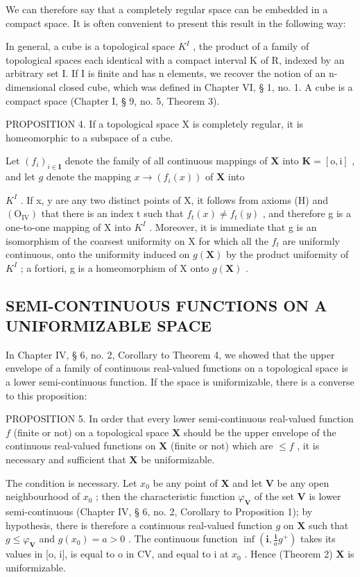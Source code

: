 We can therefore say that a completely regular space can be embedded in a compact space. It is often convenient to present this result in the following way:

In general, a cube is a topological space \(K^{I}\) , the product of a family of topological spaces each identical with a compact interval K of R, indexed by an arbitrary set I. If I is finite and has n elements, we recover the notion of an n-dimensional closed cube, which was defined in Chapter VI, § 1, no. 1. A cube is a compact space (Chapter I, § 9, no. 5, Theorem 3).

PROPOSITION 4. If a topological space X is completely regular, it is homeomorphic to a subspace of a cube.

Let \((f_{i})_{i\in \mathbf{I}}\) denote the family of all continuous mappings of \(\mathbf{X}\) into \(\mathbf{K} = [\mathrm{o},\mathrm{i}]\) , and let \(g\) denote the mapping \(x\to (f_i(x))\) of \(\mathbf{X}\) into

\(K^{I}\) . If x, y are any two distinct points of X, it follows from axioms (H) and \((\mathrm{O}_{\mathrm{IV}})\) that there is an index t such that \(f_{t}(x) \neq f_{t}(y)\) , and therefore g is a one-to-one mapping of X into \(K^{I}\) . Moreover, it is immediate that g is an isomorphism of the coarsest uniformity on X for which all the \(f_{t}\) are uniformly continuous, onto the uniformity induced on \(g(\mathbf{X})\) by the product uniformity of \(K^{I}\) ; a fortiori, g is a homeomorphism of X onto \(g(\mathbf{X})\) .

\subsection{SEMI-CONTINUOUS FUNCTIONS ON A UNIFORMIZABLE SPACE}

In Chapter IV, § 6, no. 2, Corollary to Theorem 4, we showed that the upper envelope of a family of continuous real-valued functions on a topological space is a lower semi-continuous function. If the space is uniformizable, there is a converse to this proposition:

PROPOSITION 5. In order that every lower semi-continuous real-valued function \(f\) (finite or not) on a topological space \(\mathbf{X}\) should be the upper envelope of the continuous real-valued functions on \(\mathbf{X}\) (finite or not) which are \(\leqslant f\) , it is necessary and sufficient that \(\mathbf{X}\) be uniformizable.

The condition is necessary. Let \(x_0\) be any point of \(\mathbf{X}\) and let \(\mathbf{V}\) be any open neighbourhood of \(x_0\) ; then the characteristic function \(\varphi_{\mathbf{V}}\) of the set \(\mathbf{V}\) is lower semi-continuous (Chapter IV, § 6, no. 2, Corollary to Proposition 1); by hypothesis, there is therefore a continuous real-valued function \(g\) on \(\mathbf{X}\) such that \(g \leqslant \varphi_{\mathbf{V}}\) and \(g(x_0) = a > 0\) . The continuous function \(\inf\left(\mathbf{i}, \frac{\mathbf{i}}{a} g^+\right)\) takes its values in {[}o, i{]}, is equal to o in CV, and equal to i at \(x_0\) . Hence (Theorem 2) \(\mathbf{X}\) is uniformizable.

